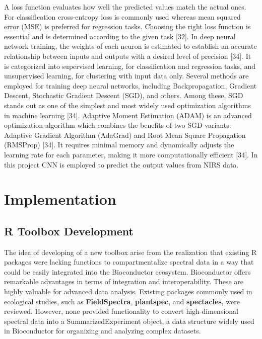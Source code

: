 \documentclass[12pt,a4paper]{report}
\begin{document}
A loss function evaluates how well the predicted values match the actual ones.  For classification cross-entropy loss is commonly used whereas mean squared error (MSE) is preferred for regression tasks. Choosing the right loss function is essential and is determined according to the given task [32]. In deep neural network training, the weights of each neuron is estimated to establish an accurate relationship between inputs and outputs with a desired level of precision [34].
It is categorized into supervised learning, for classification and regression tasks, and unsupervised learning, for clustering with input data only. Several methods are employed for training deep neural networks, including Backpropagation, Gradient Descent, Stochastic Gradient Descent (SGD), and others. Among these, SGD stands out as one of the simplest and most widely used optimization algorithms in machine learning [34]. Adaptive Moment Estimation (ADAM) is an advanced 
optimization algorithm which combines the benefits of two SGD variants: Adaptive Gradient Algorithm (AdaGrad) and Root Mean Square Propagation (RMSProp) [34]. It requires minimal memory and dynamically adjusts the learning rate for each parameter, making it more computationally efficient [34]. In this project CNN is employed to predict the output values from NIRS data. \\







\chapter{Implementation}
\section{R Toolbox Development}
The idea of developing of a new toolbox arise from the realization that existing R packages were lacking functions to compartmentalize spectral data in a way that could be easily integrated into the Bioconductor ecosystem. Bioconductor offers remarkable advantages in terms of integration and interoperability. These are highly valuable for advanced data analysis. 
Existing packages commonly used in ecological studies, such as \textbf{FieldSpectra}, \textbf{plantspec}, and \textbf{spectacles}, were reviewed. However, none provided functionality to convert high-dimensional spectral data into a SummarizedExperiment object, a data structure widely used in Bioconductor for organizing and analyzing complex datasets. \\
\end{document}
